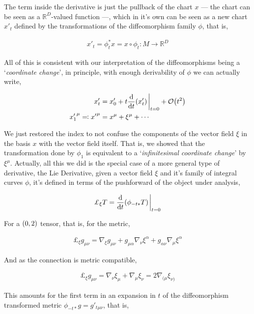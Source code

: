 The term inside the derivative is just the pullback of the chart $x$ --- the chart can be seen as a $\mathbb R^D$-valued function ---, which 
in it's own can be seen as a new chart $x'_t$ defined by the transformations of the diffeomorphism family $\phi$, that is,

\begin{align*}
    x'_t=\phi^\ast_tx=x\circ\phi_t:M\rightarrow \mathbb R^D
\end{align*}

All of this is consistent with our interpretation of the diffeomorphisms being a `\textit{coordinate change}', in principle, with 
enough derivability of $\phi$ we can actually write,

\begin{align*}
    x'_t&=x'_0+t\dv{}{t}\qty(x'_t)\eval_{t=0}+\mathcal O\qty(t^2)\\
    {x'_1}^\mu\eqcolon {x'}^\mu&={x}^\mu+\xi^\mu+\cdots
\end{align*}

We just restored the index to not confuse the components of the vector field $\xi$ in the basis $x$ with the vector field itself. 
That is, we showed that the transformation done by $\phi_1$ is equivalent to a `\textit{infinitesimal coordinate change}' by $\xi^\mu$. 
Actually, all this we did is the special case of a more general type of derivative, the Lie Derivative, given a vector field $\xi$ and it's 
family of integral curves $\phi$, it's defined in terms of the pushforward of the object under analysis,

\begin{align*}
    \pounds_\xi T=\dv{}{t}\qty(\phi_{-t\ast}T)\eval_{t=0}
\end{align*}

For a $\qty(0,2)$ tensor, that is, for the metric,

\begin{align*}
    \pounds_\xi g_{\mu\nu}=\nabla_\xi g_{\mu\nu}+g_{\mu\alpha}\nabla_\nu\xi^\alpha+g_{\alpha\nu}\nabla_\mu\xi^\alpha
\end{align*}

And as the connection is metric compatible,

\begin{align*}
    \pounds_\xi g_{\mu\nu}=\nabla_\nu\xi_\mu+\nabla_\mu\xi_\nu=2\nabla_{(\mu}\xi_{\nu)}
\end{align*}

This amounts for the first term in an expansion in $t$ of the diffeomorphism transformed metric $\phi_{-t\ast}g=g'_{t\mu\nu}$, that is, 

